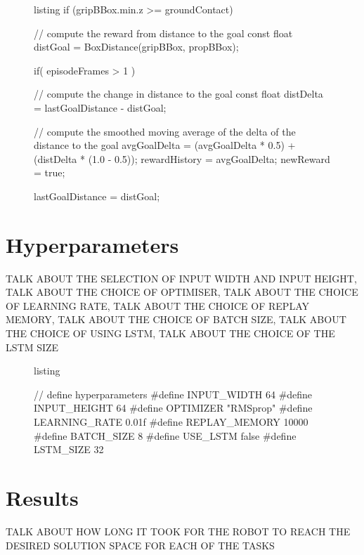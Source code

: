 \documentclass[a4paper]{article}
\begin{document}
\begin{figure}[h]\scriptsize
\begin{sexylisting}{listing}
if (gripBBox.min.z >= groundContact){
    
    // compute the reward from distance to the goal
    const float distGoal = BoxDistance(gripBBox, propBBox); 

    if( episodeFrames > 1 ){
        
        // compute the change in distance to the goal
        const float distDelta  = lastGoalDistance - distGoal;

        // compute the smoothed moving average of the delta of the distance to the goal
        avgGoalDelta  = (avgGoalDelta * 0.5) + (distDelta * (1.0 - 0.5));
        rewardHistory = avgGoalDelta;
        newReward     = true;
    }
    
    lastGoalDistance = distGoal;
    
}
\end{sexylisting}
\end{figure}



\section{Hyperparameters}
TALK ABOUT THE SELECTION OF INPUT WIDTH AND INPUT HEIGHT, TALK ABOUT THE CHOICE OF OPTIMISER, TALK ABOUT THE CHOICE OF LEARNING RATE, TALK ABOUT THE CHOICE OF REPLAY MEMORY, TALK ABOUT THE CHOICE OF BATCH SIZE, TALK ABOUT THE CHOICE OF USING LSTM, TALK ABOUT THE CHOICE OF THE LSTM SIZE

\begin{figure}[h]\scriptsize
\begin{sexylisting}{listing}

// define hyperparameters 
#define INPUT_WIDTH   64
#define INPUT_HEIGHT  64
#define OPTIMIZER "RMSprop"
#define LEARNING_RATE 0.01f
#define REPLAY_MEMORY 10000
#define BATCH_SIZE 8
#define USE_LSTM false
#define LSTM_SIZE 32

\end{sexylisting}
\end{figure}


\section{Results}
TALK ABOUT HOW LONG IT TOOK FOR THE ROBOT TO REACH THE DESIRED SOLUTION SPACE FOR EACH OF THE TASKS\\
\end{document}
